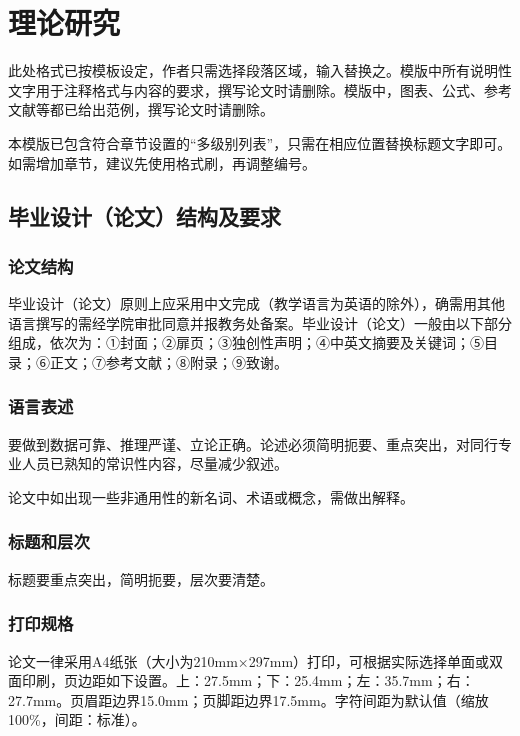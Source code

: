 \chapter{理论研究}

此处格式已按模板设定，作者只需选择段落区域，输入替换之。模版中所有说明性文字用于注释格式与内容的要求，撰写论文时请删除。模版中，图表、公式、参考文献等都已给出范例，撰写论文时请删除。

本模版已包含符合章节设置的“多级别列表”，只需在相应位置替换标题文字即可。如需增加章节，建议先使用格式刷，再调整编号。

\section{毕业设计（论文）结构及要求}

\subsection{论文结构}

毕业设计（论文）原则上应采用中文完成（教学语言为英语的除外），确需用其他语言撰写的需经学院审批同意并报教务处备案。毕业设计（论文）一般由以下部分组成，依次为：①封面；②扉页；③独创性声明；④中英文摘要及关键词；⑤目录；⑥正文；⑦参考文献；⑧附录；⑨致谢。

\subsection{语言表述}

要做到数据可靠、推理严谨、立论正确。论述必须简明扼要、重点突出，对同行专业人员已熟知的常识性内容，尽量减少叙述。

论文中如出现一些非通用性的新名词、术语或概念，需做出解释。

\subsection{标题和层次}

标题要重点突出，简明扼要，层次要清楚。

\subsection{打印规格}

论文一律采用A4纸张（大小为210mm×297mm）打印，可根据实际选择单面或双面印刷，页边距如下设置。上：27.5mm；下：25.4mm；左：35.7mm；右：27.7mm。页眉距边界15.0mm；页脚距边界17.5mm。字符间距为默认值（缩放100\%，间距：标准）。


